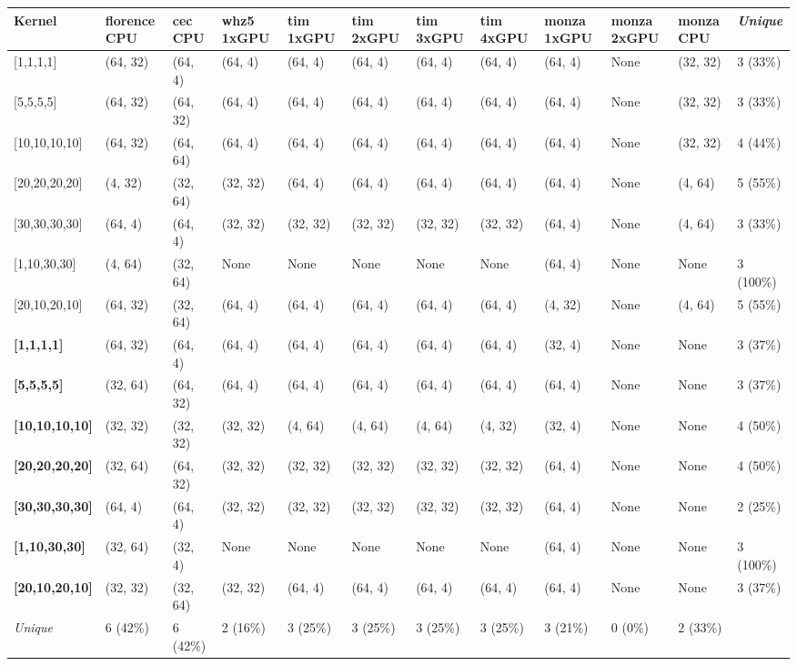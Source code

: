 \begin{tabular}{|p{1.8cm} | p{1cm} | p{1cm} | p{1cm} | p{1cm} | p{1cm} | p{1cm} | p{1cm} | p{1cm} | p{1cm} | p{1cm} | p{1.1cm}|}
\hline
\textbf{Kernel} & \textbf{florence CPU} & \textbf{cec CPU} & \textbf{whz5 1xGPU} & \textbf{tim 1xGPU} & \textbf{tim 2xGPU} & \textbf{tim 3xGPU} & \textbf{tim 4xGPU} & \textbf{monza 1xGPU} & \textbf{monza 2xGPU} & \textbf{monza CPU} & \textit{Unique}\\
\hline
{[}1,1,1,1{]} & (64, 32) & (64, 4) & (64, 4) & (64, 4) & (64, 4) & (64, 4) & (64, 4) & (64, 4) & None & (32, 32) & 3 (33\%)\\
{[}5,5,5,5{]} & (64, 32) & (64, 32) & (64, 4) & (64, 4) & (64, 4) & (64, 4) & (64, 4) & (64, 4) & None & (32, 32) & 3 (33\%)\\
{[}10,10,10,10{]} & (64, 32) & (64, 64) & (64, 4) & (64, 4) & (64, 4) & (64, 4) & (64, 4) & (64, 4) & None & (32, 32) & 4 (44\%)\\
{[}20,20,20,20{]} & (4, 32) & (32, 64) & (32, 32) & (64, 4) & (64, 4) & (64, 4) & (64, 4) & (64, 4) & None & (4, 64) & 5 (55\%)\\
{[}30,30,30,30{]} & (64, 4) & (64, 4) & (32, 32) & (32, 32) & (32, 32) & (32, 32) & (32, 32) & (64, 4) & None & (4, 64) & 3 (33\%)\\
{[}1,10,30,30{]} & (4, 64) & (32, 64) & None & None & None & None & None & (64, 4) & None & None & 3 (100\%)\\
{[}20,10,20,10{]} & (64, 32) & (32, 64) & (64, 4) & (64, 4) & (64, 4) & (64, 4) & (64, 4) & (4, 32) & None & (4, 64) & 5 (55\%)\\
\textbf{{[}1,1,1,1{]}} & (64, 32) & (64, 4) & (64, 4) & (64, 4) & (64, 4) & (64, 4) & (64, 4) & (32, 4) & None & None & 3 (37\%)\\
\textbf{{[}5,5,5,5{]}} & (32, 64) & (64, 32) & (64, 4) & (64, 4) & (64, 4) & (64, 4) & (64, 4) & (64, 4) & None & None & 3 (37\%)\\
\textbf{{[}10,10,10,10{]}} & (32, 32) & (32, 32) & (32, 32) & (4, 64) & (4, 64) & (4, 64) & (4, 32) & (32, 4) & None & None & 4 (50\%)\\
\textbf{{[}20,20,20,20{]}} & (32, 64) & (64, 32) & (32, 32) & (32, 32) & (32, 32) & (32, 32) & (32, 32) & (64, 4) & None & None & 4 (50\%)\\
\textbf{{[}30,30,30,30{]}} & (64, 4) & (64, 4) & (32, 32) & (32, 32) & (32, 32) & (32, 32) & (32, 32) & (64, 4) & None & None & 2 (25\%)\\
\textbf{{[}1,10,30,30{]}} & (32, 64) & (32, 4) & None & None & None & None & None & (64, 4) & None & None & 3 (100\%)\\
\textbf{{[}20,10,20,10{]}} & (32, 32) & (32, 64) & (32, 32) & (64, 4) & (64, 4) & (64, 4) & (64, 4) & (64, 4) & None & None & 3 (37\%)\\
\hline
\textit{Unique} & 6 (42\%) & 6 (42\%) & 2 (16\%) & 3 (25\%) & 3 (25\%) & 3 (25\%) & 3 (25\%) & 3 (21\%) & 0 (0\%) & 2 (33\%) & \\
\hline
\end{tabular}
